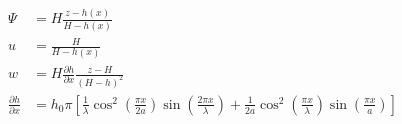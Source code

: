 \begin{align}
\Psi &= H \frac{z - h(x)}{H - h(x)} \\
u &= \frac{H}{H - h(x)} \\
w &= H \frac{\partial h}{\partial x} \frac{z - H}{\left( H - h \right)^2} \\
\frac{\partial h}{\partial x} &= h_0 \pi \left[ 
	\frac{1}{\lambda} \cos^2 \left( \frac{\pi x}{2a} \right) \sin \left( \frac{2 \pi x}{\lambda} \right) +
	\frac{1}{2a} \cos^2 \left( \frac{\pi x}{\lambda} \right) \sin \left( \frac{\pi x}{a} \right)
\right]
\end{align}
